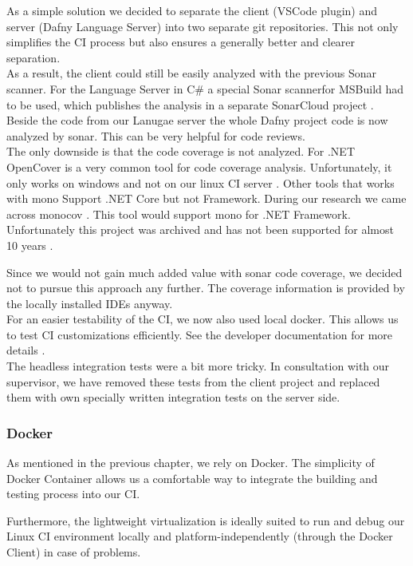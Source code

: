 As a simple solution we decided to separate the client (VSCode plugin) and server (Dafny Language Server) into two separate git repositories.
This not only simplifies the CI process but also ensures a generally better and clearer separation. \\

As a result, the client could still be easily analyzed with the previous Sonar scanner.
For the Language Server in C\# a special Sonar scannerfor MSBuild had to be used, which publishes the analysis in a separate SonarCloud project \cite{dev}.
Beside the code from our Lanugae server the whole Dafny project code is now analyzed by sonar.
This can be very helpful for code reviews. \\

The only downside is that the code coverage is not analyzed.
For .NET OpenCover is a very common tool for code coverage analysis.
Unfortunately, it only works on windows and not on our linux CI server \cite{opencover}.
Other tools that works with mono Support .NET Core but not Framework.
During our research we came across monocov \cite{monocov}. This tool would support mono for .NET Framework. Unfortunately this project was archived and has not been supported for almost 10 years \cite{monocov}.

Since we would not gain much added value with sonar code coverage, we decided not to pursue this approach any further. The coverage information is provided by the locally installed IDEs anyway.
\\

For an easier testability of the CI, we now also used local docker. This allows us to test CI customizations efficiently. See the developer documentation for more details \cite{dev}. \\

The headless integration tests were a bit more tricky.
In consultation with our supervisor, we have removed these tests from the client project and replaced them with own specially written integration tests on the server side.

\subsubsection{Docker}
As mentioned in the previous chapter, we rely on Docker.
The simplicity of Docker Container allows us a comfortable way to integrate the building and testing process into our CI.

Furthermore, the lightweight virtualization is ideally suited to run and debug our Linux CI environment
locally and platform-independently (through the Docker Client) in case of problems. \\

